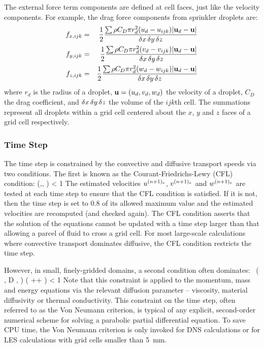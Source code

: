\documentclass[11pt]{book}
\begin{document}
The external force term components are defined at cell faces, just like the velocity components. For example, the drag force components
from sprinkler droplets are:
\begin{eqnarray}
f_{x,ijk} &=&\frac{1}{2}\frac{\sum \rho C_D\pi r_d^2 (u_d-u_{ijk}) |{\bf u}_d-{\bf u}|}{\delta x\, \delta y\, \delta z}  \\
f_{y,ijk} &=&\frac{1}{2}\frac{\sum \rho C_D\pi r_d^2 (v_d-v_{ijk}) |{\bf u}_d-{\bf u}|}{\delta x\, \delta y\, \delta z}  \\
f_{z,ijk} &=&\frac{1}{2}\frac{\sum \rho C_D\pi r_d^2 (w_d-w_{ijk}) |{\bf u}_d-{\bf u}|}{\delta x\, \delta y \,\delta z}
\end{eqnarray}
where $r_d$ is the radius of a droplet, ${\bf u}=(u_d,v_d,w_d)$ the velocity of a droplet, $C_D$ the drag
coefficient, and $\delta x \, \delta y \,\delta z$ the volume of the $ijk$th cell.
The summations represent all droplets within a grid cell centered about
the $x$, $y$ and $z$ faces of a grid cell respectively.


\subsubsection{Time Step}

\label{stability}

The time step is constrained by the convective and diffusive
transport speeds via two conditions. The first is known as the
Courant-Friedrichs-Lewy (CFL) condition:
\be \dt \; \max \left(,, \right) < 1  \label{cfl} \ee
The estimated velocities
$u^{(n+1)_e}$, $v^{(n+1)_e}$ and $w^{(n+1)_e}$ are tested at each
time step to ensure that the CFL condition is satisfied. If it is not,
then the time step is set to 0.8 of its allowed maximum value
and the estimated velocities are recomputed (and checked again).
The CFL condition asserts that the solution of the equations cannot be updated with a time step
larger than that allowing a parcel of fluid to cross a grid cell. For most large-scale calculations where
convective transport dominates diffusive, the CFL condition restricts the time step.

However, in small, finely-gridded domains, a second condition often dominates:
 \, \max \left( \nu , D ,  \right)  \; \dt  \left(
              ++ \right) < 1  \label{vn} \ee
Note that this constraint is applied to the momentum, mass and energy equations via the
relevant diffusion parameter -- viscosity, material diffusivity or thermal conductivity.
This constraint on the time step, often referred to as the Von Neumann criterion, is typical
of any explicit, second-order numerical scheme for solving a parabolic partial differential
equation. To save CPU time, the Von Neumann criterion is only invoked for DNS calculations or for LES
calculations with grid cells smaller than 5~mm.
\end{document}
